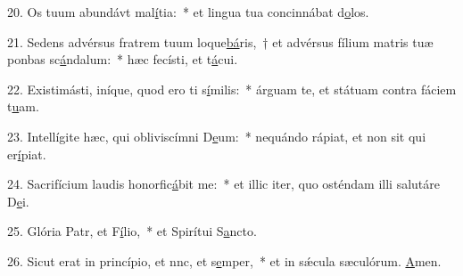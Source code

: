 20. Os tuum abundávt mal\uline{í}tia:~* et lingua tua concinnábat d\uline{o}los.\par 
21. Sedens advérsus fratrem tuum loque\uline{bá}ris,~† et advérsus fílium matris tuæ ponbas sc\uline{á}ndalum:~* hæc fecísti, et t\uline{á}cui.\par 
22. Existimásti, iníque, quod ero ti s\uline{í}milis:~* árguam te, et státuam contra fáciem t\uline{u}am.\par 
23. Intellígite hæc, qui obliviscímni D\uline{e}um:~* nequándo rápiat, et non sit qui er\uline{í}piat.\par 
24. Sacrifícium laudis honorfic\uline{á}bit me:~* et illic iter, quo osténdam illi salutáre D\uline{e}i.\par 
25. Glória Patr, et F\uline{í}lio,~* et Spirítui S\uline{a}ncto.\par 
26. Sicut erat in princípio, et nnc, et s\uline{e}mper,~* et in sǽcula sæculórum. \uline{A}men.\par 
